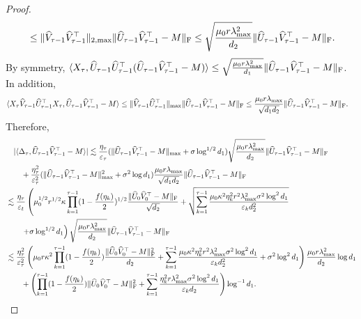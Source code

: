 \documentclass[12pt]{article}
\newcommand\fro[1]{\| #1 \|_{\rm{F}}}
\newcommand{\inp}[2]{\langle #1,#2\rangle}
\theoremstyle{plain}
\begin{document}
\begin{proof}
\begin{align*}
        &\quad \leq \|\widehat{V}_{\tau-1}\widehat{V}_{\tau-1}^{\top}\|_{2,\max}\fro{\widehat{U}_{\tau-1}\widehat{V}_{\tau-1}^{\top} - M} \leq \sqrt{\frac{\mu_0r\lambda_{\max}^2}{d_2}}\fro{\widehat{U}_{\tau-1}\widehat{V}_{\tau-1}^{\top} - M}.
    \end{align*}
    By symmetry, $\inp{X_\tau}{\widehat{U}_{\tau-1}\widehat{U}_{\tau-1}^{\top}(\widehat{U}_{\tau-1}\widehat{V}_{\tau-1}^{\top} - M)}\leq \sqrt{\frac{\mu_0r\lambda_{\max}^2}{d_1}}\fro{\widehat{U}_{\tau-1}\widehat{V}_{\tau-1}^{\top} - M}$. In addition, 
    \begin{align*}
        \inp{X_\tau \widehat{V}_{\tau-1}\widehat{U}_{\tau-1}^{\top}X_\tau}{\widehat{U}_{\tau-1}\widehat{V}_{\tau-1}^{\top} - M}&\leq  \|\widehat{V}_{\tau-1}\widehat{U}_{\tau-1}^{\top}\|_{\max}\fro{\widehat{U}_{\tau-1}\widehat{V}_{\tau-1}^{\top} - M} \leq \frac{\mu_0r\lambda_{\max}}{\sqrt{d_1d_2}}\fro{\widehat{U}_{\tau-1}\widehat{V}_{\tau-1}^{\top} - M}.
    \end{align*}
    Therefore,  
    \begin{align*}
        &\quad |\inp{\Delta_\tau}{\widehat{U}_{\tau-1}\widehat{V}_{\tau-1}^{\top}-M}| \lesssim  \frac{\eta_\tau}{\varepsilon_\tau} (\|\widehat{U}_{\tau-1}\widehat{V}_{\tau-1}^{\top} - M\|_{\max}+\sigma\log^{1/2}d_1)\sqrt{\frac{\mu_0r\lambda_{\max}^2}{d_2}}\fro{\widehat{U}_{\tau-1}\widehat{V}_{\tau-1}^{\top} - M} \\ &\quad\quad + \frac{\eta_\tau^2}{\varepsilon_\tau^2} (\|\widehat{U}_{\tau-1}\widehat{V}_{\tau-1}^{\top} - M\|_{\max}^2 +\sigma^2\log d_1) \frac{\mu_0r\lambda_{\max}}{\sqrt{d_1d_2}}\fro{\widehat{U}_{\tau-1}\widehat{V}_{\tau-1}^{\top} - M} \\
        &\lesssim \frac{\eta_\tau}{\varepsilon_t}\left(\mu_0^{1/2}r^{1/2}\kappa \prod_{k=1}^{\tau-1} (1-\frac{f(\eta_k)}{2})^{1/2}\frac{\fro{\widehat{U}_0\widehat{V}_0^{\top}-M}}{\sqrt{d_2}} + \sqrt{\sum_{k=1}^{\tau-1}\frac{\mu_0\kappa^2 \eta_k^2r^2\lambda_{\max}^2\sigma^2\log^2d_1}{\varepsilon_k d_2^2}} \right.\\ &\left.\quad\quad + \sigma\log^{1/2}d_1\right)\sqrt{\frac{\mu_0r\lambda_{\max}^2}{d_2}}\fro{\widehat{U}_{\tau-1}\widehat{V}_{\tau-1}^{\top} - M} \\
        &\lesssim \frac{\eta_\tau^2}{\varepsilon_\tau^2}\left(\mu_0 r\kappa^2 \prod_{k=1}^{\tau-1} (1-\frac{f(\eta_k)}{2})\frac{\fro{\widehat{U}_0\widehat{V}_0^{\top}-M}^2}{d_2} + \sum_{k=1}^{\tau-1}\frac{\mu_0\kappa^2 \eta_k^2r^2\lambda_{\max}^2\sigma^2\log^2d_1}{\varepsilon_k d_2^2} + \sigma^2\log^2 d_1\right)\frac{\mu_0r\lambda_{\max}^2}{d_2}\log d_1 \\ &\quad\quad + \left(\prod_{k=1}^{\tau-1} (1-\frac{f(\eta_k)}{2})\fro{\widehat{U}_0\widehat{V}_0^{\top}-M}^2 + \sum_{k=1}^{\tau-1}\frac{\eta_k^2r\lambda_{\max}^2\sigma^2\log^2d_1}{\varepsilon_kd_2}\right)\log^{-1}d_1.

\end{align*}
\end{proof}
\end{document}
